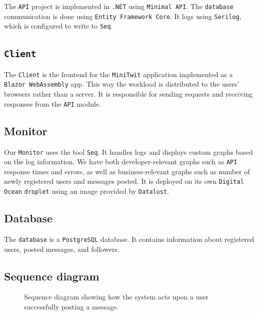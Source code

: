 The \texttt{API} project is implemented in \texttt{.NET} using \texttt{Minimal API}\cite{minimalApi}.
The \texttt{database} communication is done using \texttt{Entity Framework Core}.
It logs using \texttt{Serilog}\cite{serilog}, 
which is configured to write to \texttt{Seq}\cite{seq}.

\subsection{\texttt{Client}}

The \texttt{Client} is the frontend for the \texttt{MiniTwit} application implemented as a \texttt{Blazor WebAssembly} app. 
This way the workload is distributed to the users' browsers rather than a server. It is responsible for sending requests and 
receiving responses from the \texttt{API} module.

\subsection{Monitor}

Our \texttt{Monitor} uses the tool \texttt{Seq}\cite{seq}.
It handles logs and displays custom graphs based on 
the log information. We have both developer-relevant 
graphs such as \texttt{API} response times and errors,
as well as business-relevant graphs such as number 
of newly registered users and messages posted.
It is deployed on its own \texttt{Digital Ocean} \texttt{droplet} 
using an image provided by \texttt{Datalust}\cite{seq}.

\subsection{Database}

The \texttt{database} is a \texttt{PostgreSQL}\cite{postgres} database.
It contains information about registered users,
posted messages, and followers.

\subsection{Sequence diagram}

\begin{figure}[H]
    \centering
    \caption{Sequence diagram showing how the system acts upon 
    a user successfully posting a message.}
    \label{fig:seq_diagram}
\end{figure}

